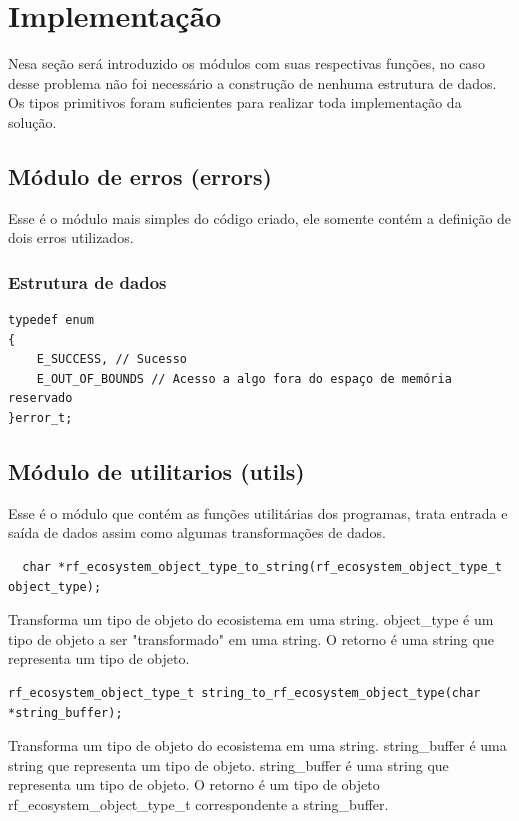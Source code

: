 \documentclass{article}
\begin{document}
\section{Implementação}

Nesa seção será introduzido os módulos com suas respectivas funções, no caso desse problema não foi necessário a construção de nenhuma estrutura de dados. Os tipos primitivos foram suficientes para realizar toda implementação da solução.

\subsection{Módulo de erros (errors)}

Esse é o módulo mais simples do código criado, ele somente contém a definição de dois erros utilizados.

\subsubsection{Estrutura de dados}

\begin{verbatim}
typedef enum
{
    E_SUCCESS, // Sucesso
    E_OUT_OF_BOUNDS // Acesso a algo fora do espaço de memória reservado
}error_t;
\end{verbatim}

\subsection{Módulo de utilitarios (utils)}

Esse é o módulo que contém as funções utilitárias dos programas, trata entrada e saída de dados assim como algumas transformações de dados.


\begin{verbatim}
  char *rf_ecosystem_object_type_to_string(rf_ecosystem_object_type_t object_type);
\end{verbatim}

Transforma um tipo de objeto do ecosistema em uma string. object\_type é um tipo de objeto a ser "transformado" em uma string. O retorno é uma string que representa um tipo de objeto.

\begin{verbatim}
rf_ecosystem_object_type_t string_to_rf_ecosystem_object_type(char *string_buffer);
\end{verbatim}

Transforma um tipo de objeto do ecosistema em uma string. string\_buffer é uma string que representa um tipo de objeto. string\_buffer é uma string que representa um tipo de objeto. O retorno é um tipo de objeto rf\_ecosystem\_object\_type\_t correspondente a string\_buffer.
\end{document}
